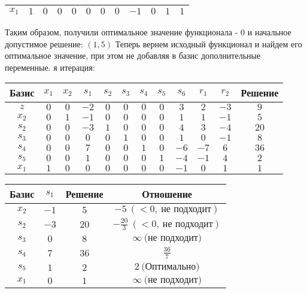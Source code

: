 \documentclass{article}%
\begin{document}
\begin{flushleft}
\begin{tabular}{|c|cccccccccc|c|}
$x_{1}$&$1$&$0$&$0$&$0$&$0$&$0$&$0$&$-1$&$0$&$1$&$1$\\%
\hline%
\end{tabular}%
\newline%
\newline%
Таким образом, получили оптимальное значение функционала {-} 0 и начальное допустимое решение: %
$(1, 5)$%
\newline%
Теперь вернем исходный функционал и найдем его оптимальное значение, при этом не добавляя в базис дополнительные переменные.%
я итерация: %
\newline%
\newline%
\renewcommand{\arraystretch}{1.3}%
\begin{tabular}{|c|cccccccccc|c|}%
\hline%
Базис&$x_{1}$&$x_{2}$&$s_{1}$&$s_{2}$&$s_{3}$&$s_{4}$&$s_{5}$&$s_{6}$&$r_{1}$&$r_{2}$&Решение\\%
\hline%
$z$&$0$&$0$&$-2$&$0$&$0$&$0$&$0$&$3$&$2$&$-3$&$9$\\%
\hline%
$x_{2}$&$0$&$1$&$-1$&$0$&$0$&$0$&$0$&$1$&$1$&$-1$&$5$\\%
$s_{2}$&$0$&$0$&$-3$&$1$&$0$&$0$&$0$&$4$&$3$&$-4$&$20$\\%
$s_{3}$&$0$&$0$&$0$&$0$&$1$&$0$&$0$&$1$&$0$&$-1$&$8$\\%
$s_{4}$&$0$&$0$&$7$&$0$&$0$&$1$&$0$&$-6$&$-7$&$6$&$36$\\%
$s_{5}$&$0$&$0$&$1$&$0$&$0$&$0$&$1$&$-4$&$-1$&$4$&$2$\\%
$x_{1}$&$1$&$0$&$0$&$0$&$0$&$0$&$0$&$-1$&$0$&$1$&$1$\\%
\hline%
\end{tabular}%
\newline%
\newline%
\newline%
\begin{tabular}{|cccc|}%
\hline%
Базис&$s_{1}$&Решение&Отношение\\%
\hline%
$x_{2}$&$-1$&$5$&$-5\: (< 0, \: \text{не подходит})$\\%
$s_{2}$&$-3$&$20$&$-\frac{20}{3}\: (< 0, \: \text{не подходит})$\\%
$s_{3}$&$0$&$8$&$\infty \: \text{(не подходит)}$\\%
$s_{4}$&$7$&$36$&$\frac{36}{7}$\\%
$s_{5}$&$1$&$2$&$2\: \text{(Оптимально)}$\\%
$x_{1}$&$0$&$1$&$\infty \: \text{(не подходит)}$\\%
\hline%
\end{tabular}%

\end{flushleft}
\end{document}
